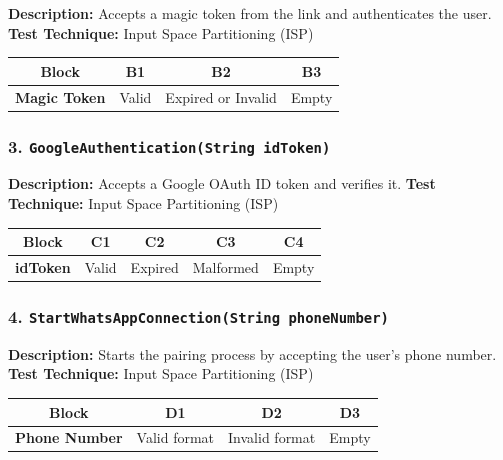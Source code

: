 \textbf{Description:} Accepts a magic token from the link and authenticates the user.  
\textbf{Test Technique:} Input Space Partitioning (ISP)

\begin{table}[h!]
\centering
\begin{tabular}{|c|c|c|c|}
\hline
\textbf{Block} & \textbf{B1} & \textbf{B2} & \textbf{B3} \\
\hline
\textbf{Magic Token} & Valid & Expired or Invalid & Empty \\
\hline
\end{tabular}
\end{table}

\subsubsection*{3. \texttt{GoogleAuthentication(String idToken)}}

\textbf{Description:} Accepts a Google OAuth ID token and verifies it.  
\textbf{Test Technique:} Input Space Partitioning (ISP)

\begin{table}[h!]
\centering
\begin{tabular}{|c|c|c|c|c|}
\hline
\textbf{Block} & \textbf{C1} & \textbf{C2} & \textbf{C3} & \textbf{C4} \\
\hline
\textbf{idToken} & Valid & Expired & Malformed & Empty \\
\hline
\end{tabular}
\end{table}

\subsubsection*{4. \texttt{StartWhatsAppConnection(String phoneNumber)}}

\textbf{Description:} Starts the pairing process by accepting the user’s phone number.  
\textbf{Test Technique:} Input Space Partitioning (ISP)

\begin{table}[h!]
\centering
\begin{tabular}{|c|c|c|c|}
\hline
\textbf{Block} & \textbf{D1} & \textbf{D2} & \textbf{D3} \\
\hline
\textbf{Phone Number} & Valid format & Invalid format & Empty \\
\hline
\end{tabular}
\end{table}

